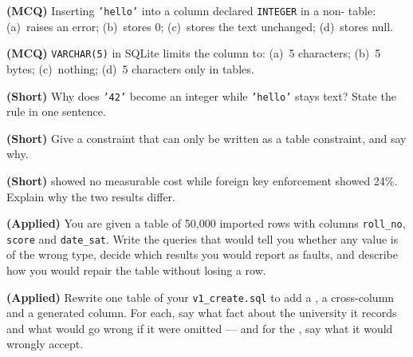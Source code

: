 \begin{reviewq}
  \item \textbf{(MCQ)} Inserting \texttt{'hello'} into a column declared
        \texttt{INTEGER} in a non- table: (a)~raises an error;
        (b)~stores 0; (c)~stores the text unchanged; (d)~stores null.
  \item \textbf{(MCQ)} \texttt{VARCHAR(5)} in SQLite limits the column to:
        (a)~5 characters; (b)~5 bytes; (c)~nothing; (d)~5 characters only in
         tables.
  \item \textbf{(Short)} Why does \texttt{'42'} become an integer while
        \texttt{'hello'} stays text? State the rule in one sentence.
  \item \textbf{(Short)} Give a constraint that can only be written as a table
        constraint, and say why.
  \item \textbf{(Short)}  showed no measurable cost while foreign
        key enforcement showed 24\%. Explain why the two results differ.
  \item \textbf{(Applied)} You are given a table of 50{,}000 imported rows with
        columns \texttt{roll\_no}, \texttt{score} and \texttt{date\_sat}.
        Write the queries that would tell you whether any value is of the wrong
        type, decide which results you would report as faults, and describe
        how you would repair the table without losing a row.
  \item \textbf{(Applied)} Rewrite one table of your \texttt{v1\_create.sql} to
        add a , a cross-column  and a
         generated column. For each, say what fact about the
        university it records and what would go wrong if it were omitted ---
        and for the , say what it would wrongly accept.
\end{reviewq}
